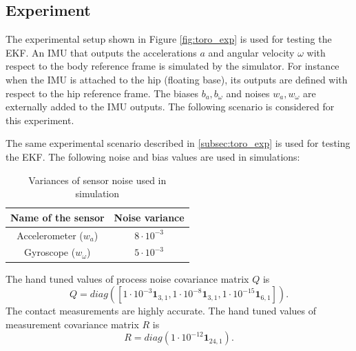 \subsection{Experiment}

The experimental setup shown in Figure \ref{fig:toro_exp} is used for testing the EKF. An IMU that outputs the accelerations $a$ and angular velocity $\omega$ with respect to the body reference frame is simulated by the simulator. For instance when the IMU is attached to the hip (floating base), its outputs are defined with respect to the hip reference frame. The biases $b_a,b_\omega$ and noises $w_a,w_\omega$ are externally added to the IMU outputs. The following scenario is considered for this experiment. 

The same experimental scenario described in \ref{subsec:toro_exp} is used for testing the EKF. The following noise and bias values are used in simulations:

\begin{table}
	\centering
	\begin{tabular}{|c|c|}
	\hline
	Name of the sensor &Noise variance \\ \hline
	Accelerometer ($w_a$) & $8 \cdot {10}^{-3}$ \\
	Gyroscope ($w_\omega$) & $5 \cdot {10}^{-3}$ \\ \hline	
	\end{tabular}
	\caption{Variances of sensor noise used in simulation}
	\label{tab:simp_noise}
\end{table}

The hand tuned values of process noise covariance matrix $Q$ is 
$$ Q = diag([ 1 \cdot {10}^{-3} \textbf{1}_{3,1}, 1 \cdot {10}^{-8} \textbf{1}_{3,1}, 1 \cdot {10}^{-15} \textbf{1}_{6,1}]). $$
The contact measurements are highly accurate. The hand tuned values of measurement covariance matrix $R$ is $$R = diag(1 \cdot {10}^{-12} \textbf{1}_{24,1}).$$

